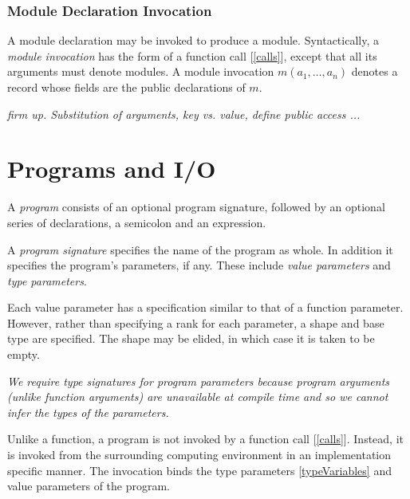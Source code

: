 \documentclass{article}
\begin{document}
\subsubsection{Module Declaration Invocation}
\label{moduleDeclarationInvocation}

A module declaration may be invoked to produce a module. Syntactically, a {\em module invocation} has the form of a function call [\ref{calls}], except that all its arguments must denote modules.
A module invocation $m(a_1, \ldots, a_n)$ denotes a record whose fields are the public declarations of $m$.

{\em firm up. Substitution of arguments, key vs. value, define public access ...}

\section{Programs and I/O}
\label{programsAndIO}

A {\em program} consists of an optional  program signature, followed by an optional  series of declarations, a semicolon and an expression.

\Program{}

A {\em program signature} specifies the name of the program as whole. In addition it specifies the program's parameters, if any.  These include {\em value parameters} and {\em type parameters}. 

\ProgramSignature{}

\ProgramParameterList{}

\ProgramParameter{}

\TypeSigSuffix{}

\TypeSig{}

\ExternalFunctionSignature{}

\TypeParameterList{}

Each value parameter has a specification similar to that of a function parameter. However, rather than specifying a rank for each parameter, a shape and base type are specified. The shape may be elided, in which case it is taken to be empty. 

{\em
We require type signatures for program parameters because program arguments (unlike function arguments) are unavailable at compile time and so we cannot
infer the types of the parameters.
}

Unlike a function, a program is not invoked by a function call [\ref{calls}]. Instead, it is invoked from the surrounding computing environment in an implementation specific manner.  The invocation binds the type parameters \ref{typeVariables} and value parameters of the program. 
\end{document}
